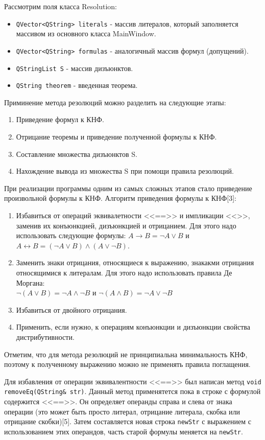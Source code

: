 \documentclass[12pt, a4paper]{article}
\begin{document}
	 \par Рассмотрим поля класса Resolution:
	 \begin{itemize}
	 	\item \texttt{QVector<QString> literals} - массив литералов, который заполняется массивом из основного класса MainWindow.
	 	\item \texttt{QVector<QString> formulas} - аналогичный массив формул (допущений).
	 	\item \texttt{QStringList S} - массив дизъюнктов. 
	 	\item \texttt{QString theorem} - введенная теорема.
	 \end{itemize}
	 \par Приминение метода резолюций можно разделить на следующие этапы:
	 \begin{enumerate}
	 	\item Приведение формул к КНФ.
	 	\item Отрицание теоремы и приведение полученной формулы к КНФ.
	 	\item Составление множества дизъюнктов S.
	 	\item Нахождение вывода из множества S при помощи правила резолюций.
	 \end{enumerate}
	 \par При реализации программы одним из самых сложных этапов стало приведение произвольной формулы к КНФ. Алгоритм приведения формулы к КНФ[3]:
	 \begin{enumerate}
	 	\item Избавиться от операций эквивалетности <<==>> и импликации <<\text{->}>>, заменив их конъюнкцией, дизъюнкцией и отрицанием. Для этого надо использовать следующие формулы: $A \rightarrow B = \neg A \lor B$ и $A \leftrightarrow B = (\neg A \lor B) \land (A \lor \neg B)$.
	 	\item Заменить знаки отрицания, относящиеся к выражению, знакакми отрицания относящимися к литералам. Для этого надо использовать правила Де Моргана:\\ $\neg (A \lor B) = \neg A \land \neg B$ и $\neg (A \land B) = \neg A \lor \neg B$
	 	\item Избавиться от двойного отрицания.
	 	\item Применить, если нужно, к операциям конъюнкции и дизъюнкции свойства дистрибутивности.
	 \end{enumerate}
	 Отметим, что для метода резолюций не принципиальна минимальность КНФ, поэтому к полученному выражению можно не применять правила поглащения.
	 \par Для избавления от операции эквивалентности <<==>> был написан метод \texttt{void}\\ \texttt{removeEq(QString\& str)}. Данный метод применятется пока в строке с формулой содержится <<==>>. Он определяет операнды справа и слева от знака операции (это может быть просто литерал, отрицание литерала,  скобка или отрицание скобки)[5]. Затем составляется новая строка \texttt{newStr} с выражением с использованием этих операндов, часть старой формулы меняется на \texttt{newStr}.
\end{document}
